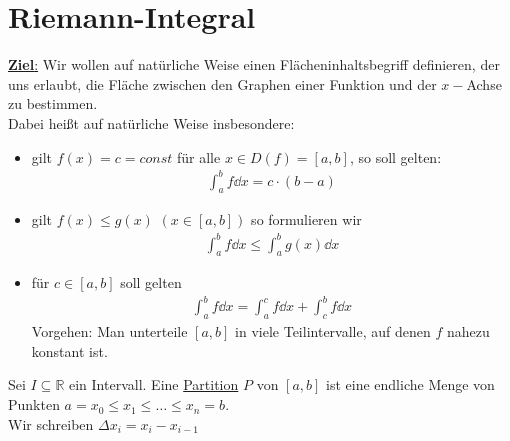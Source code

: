 \section{Riemann-Integral}\label{kap_riemann_integral}
\underline{\textbf{Ziel}:} Wir wollen auf \glqq{} natürliche\grqq{} Weise einen 
Flächeninhaltsbegriff definieren, der uns erlaubt, die Fläche zwischen den Graphen 
einer Funktion und der $x-$Achse zu bestimmen. \\
Dabei heißt auf \glqq natürliche Weise\grqq{} insbesondere: 
\begin{itemize}
	\item gilt $f(x) = c = const$ für alle $x \in D (f) = [a,b]$, so soll 
	gelten:
	\begin{align*}
		\int_a^b f \dd{x} = c \cdot ( b - a)
	\end{align*}
	\item gilt $f(x) \leq g(x)$ $(x \in [a,b])$ so formulieren wir
	\begin{align*}
		\int_a^b f \dd{x} \leq \int_a^b g(x) \dd{x} 
	\end{align*}
	\item für $c \in [a,b]$ soll gelten
	\begin{align*}
		\int_a^b f \dd{x} = \int_a^c f \dd{x} + \int_c^b f\dd{x}
	\end{align*}
	Vorgehen: Man unterteile $[a,b]$ in \glqq viele\grqq{} Teilintervalle, auf denen 
	$f$ nahezu konstant ist.
\end{itemize} 

\begin{Definition}{
	Sei $ I \subseteq \mathbb{R}$ ein Intervall. Eine \underline{Partition} $P$ von 
	$[a,b]$ ist eine endliche Menge von Punkten $a = x_0 \leq x_1 \leq \hdots
	\leq x_n = b$.\\
	Wir schreiben $\Delta x_i = x_i - x_{i-1}$
}\end{Definition}

